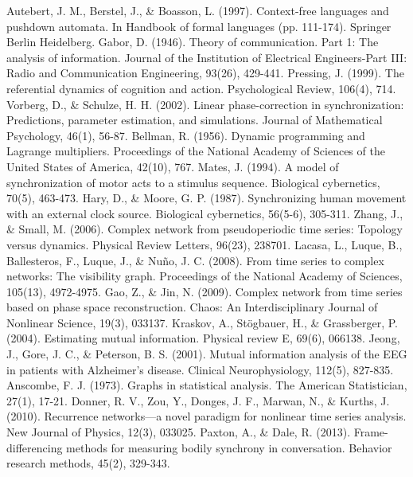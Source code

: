 \documentclass[12pt]{article}
\begin{document}
\begin{thebibliography}{}
    Autebert, J. M., Berstel, J., \& Boasson, L. (1997). Context-free languages and pushdown automata. In Handbook of formal languages (pp. 111-174). Springer Berlin Heidelberg.
    Gabor, D. (1946). Theory of communication. Part 1: The analysis of information. Journal of the Institution of Electrical Engineers-Part III: Radio and Communication Engineering, 93(26), 429-441.
    Pressing, J. (1999). The referential dynamics of cognition and action. Psychological Review, 106(4), 714.
    Vorberg, D., \& Schulze, H. H. (2002). Linear phase-correction in synchronization: Predictions, parameter estimation, and simulations. Journal of Mathematical Psychology, 46(1), 56-87.
    Bellman, R. (1956). Dynamic programming and Lagrange multipliers. Proceedings of the National Academy of Sciences of the United States of America, 42(10), 767.
    Mates, J. (1994). A model of synchronization of motor acts to a stimulus sequence. Biological cybernetics, 70(5), 463-473.
    Hary, D., \& Moore, G. P. (1987). Synchronizing human movement with an external clock source. Biological cybernetics, 56(5-6), 305-311.
    Zhang, J., \& Small, M. (2006). Complex network from pseudoperiodic time series: Topology versus dynamics. Physical Review Letters, 96(23), 238701.
    Lacasa, L., Luque, B., Ballesteros, F., Luque, J., \& Nuño, J. C. (2008). From time series to complex networks: The visibility graph. Proceedings of the National Academy of Sciences, 105(13), 4972-4975.
    Gao, Z., \& Jin, N. (2009). Complex network from time series based on phase space reconstruction. Chaos: An Interdisciplinary Journal of Nonlinear Science, 19(3), 033137.
    Kraskov, A., Stögbauer, H., \& Grassberger, P. (2004). Estimating mutual information. Physical review E, 69(6), 066138.
    Jeong, J., Gore, J. C., \& Peterson, B. S. (2001). Mutual information analysis of the EEG in patients with Alzheimer's disease. Clinical Neurophysiology, 112(5), 827-835.
    Anscombe, F. J. (1973). Graphs in statistical analysis. The American Statistician, 27(1), 17-21.
    Donner, R. V., Zou, Y., Donges, J. F., Marwan, N., \& Kurths, J. (2010). Recurrence networks—a novel paradigm for nonlinear time series analysis. New Journal of Physics, 12(3), 033025.
    Paxton, A., \& Dale, R. (2013). Frame-differencing methods for measuring bodily synchrony in conversation. Behavior research methods, 45(2), 329-343.

\end{thebibliography}
\end{document}

